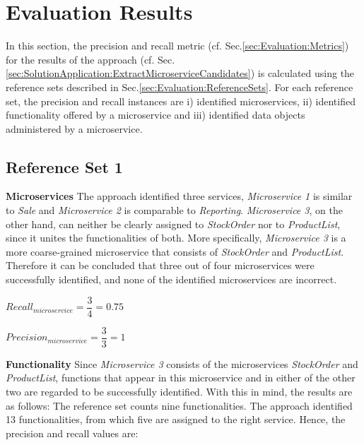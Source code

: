 \section{Evaluation Results}
\label{sec:Evalutation:PrecisionAndRecallMeasurement}
In this section, the precision and recall metric (cf. Sec.\ref{sec:Evaluation:Metrics}) for the results of the approach (cf. Sec.\ref{sec:SolutionApplication:ExtractMicroserviceCandidates}) is calculated using the reference sets described in Sec.\ref{sec:Evaluation:ReferenceSets}. 
For each reference set, the precision and recall instances are i) identified microservices, ii) identified functionality offered by a microservice and iii) identified data objects administered by a microservice. 

\subsection{Reference Set 1}

\textbf{Microservices} The approach identified three services, \textit{Microservice 1} is similar to \textit{Sale} and \textit{Microservice 2} is comparable to \textit{Reporting}. \textit{Microservice 3}, on the other hand, can neither be clearly assigned to \textit{StockOrder} nor to \textit{ProductList}, since it unites the functionalities of both. More specifically, \textit{Microservice 3} is a more coarse-grained microservice that consists of \textit{StockOrder} and \textit{ProductList}. Therefore it can be concluded that three out of four microservices were successfully identified, and none of the identified microservices are incorrect. 

\hspace{1cm}
\noindent
\begin{minipage}{.4\linewidth}
		\vspace{0.5cm}
	\flushleft

		
	$Recall_{microservice}=\dfrac{3}{4} = 0.75  $
		\vspace{0.5cm}
	
\end{minipage}%
\begin{minipage}{.5\linewidth}
	\vspace{0.5cm}
	\flushleft

		
	$Precision_{microservice}=\dfrac{3}{3} = 1  $
		\vspace{0.5cm}
	
\end{minipage}

\noindent
\textbf{Functionality} Since \textit{Microservice 3} consists of the microservices \textit{StockOrder} and \textit{ProductList}, functions that appear in this microservice and in either of the other two are regarded to be successfully identified. With this in mind, the results are as follows: The reference set counts nine functionalities. The approach identified 13 functionalities, from which five are assigned to the right service. Hence, the precision and recall values are:

